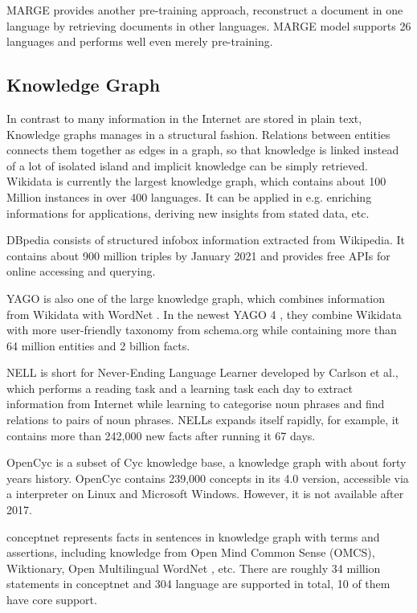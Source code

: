 MARGE \cite{DBLP:journals/corr/abs-2006-15020} provides another pre-training approach, 
reconstruct a document in one language by retrieving documents in other languages. 
MARGE model supports 26 languages and performs well even merely pre-training. 

\subsection*{Knowledge Graph}

In contrast to many information in the Internet are stored in plain text, 
Knowledge graphs manages in a structural fashion. 
Relations between entities connects them together as edges in a graph, 
so that knowledge is linked instead of a lot of isolated island and implicit knowledge can be simply retrieved. 
Wikidata \cite{10.1145/2629489} is currently the largest knowledge graph, 
which contains about 100 Million instances in over 400 languages. 
It can be applied in e.g. enriching informations for applications, deriving new insights from stated data, etc.

DBpedia \cite{10.1007/978-3-540-76298-0_52} consists of structured infobox information extracted from Wikipedia. 
It contains about 900 million triples by January 2021 and provides free APIs for online accessing and querying. 

YAGO \cite{10.1145/1242572.1242667} is also one of the large knowledge graph, 
which combines information from Wikidata with WordNet \cite{Fellbaum1998}. 
In the newest YAGO 4 \cite{10.1007/978-3-030-49461-2_34}, 
they combine Wikidata with more user-friendly taxonomy from schema.org \cite{10.1145/2844544} 
while containing more than 64 million entities and 2 billion facts. 

NELL \cite{10.5555/2898607.2898816} is short for Never-Ending Language Learner developed by Carlson et al., 
which performs a reading task and a learning task each day to extract information from Internet 
while learning to categorise noun phrases and find relations to pairs of noun phrases. 
NELLs expands itself rapidly, for example, it contains more than 242,000 new facts after running it 67 days. 

OpenCyc \cite{opencyc} is a subset of Cyc knowledge base, 
a knowledge graph with about forty years history. OpenCyc contains 239,000 concepts in its 4.0 version, 
accessible via a interpreter on Linux and Microsoft Windows. However, it is not available after 2017.

conceptnet \cite{speer2017conceptnet} represents facts in sentences in knowledge graph with terms and assertions, 
including knowledge from Open Mind Common Sense (OMCS), Wiktionary, Open Multilingual WordNet \cite{bond-foster-2013-linking}, etc. 
There are roughly 34 million statements in conceptnet and 304 language are supported in total, 10 of them have core support.

